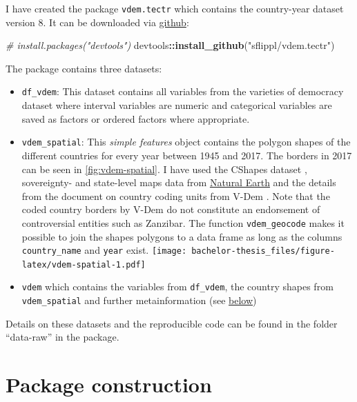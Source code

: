 \documentclass[]{report}
\newenvironment{Shaded}{\begin{snugshade}}{\end{snugshade}}
\newcommand{\KeywordTok}[1]{\textcolor[rgb]{0.13,0.29,0.53}{\textbf{#1}}}
\newcommand{\StringTok}[1]{\textcolor[rgb]{0.31,0.60,0.02}{#1}}
\newcommand{\CommentTok}[1]{\textcolor[rgb]{0.56,0.35,0.01}{\textit{#1}}}
\newcommand{\OperatorTok}[1]{\textcolor[rgb]{0.81,0.36,0.00}{\textbf{#1}}}
\newcommand{\NormalTok}[1]{#1}
\providecommand{\tightlist}{%
  \setlength{\itemsep}{0pt}\setlength{\parskip}{0pt}}
\theoremstyle{definition}
\theoremstyle{definition}
\theoremstyle{definition}
\theoremstyle{remark}
\begin{document}
I have created the package \texttt{vdem.tectr} which contains the
country-year dataset version 8. It can be downloaded via
\href{github.com/sflippl/vdem.tectr}{github}:

\begin{Shaded}
\begin{Highlighting}[]
\CommentTok{# install.packages("devtools")}
\NormalTok{devtools}\OperatorTok{::}\KeywordTok{install_github}\NormalTok{(}\StringTok{"sflippl/vdem.tectr"}\NormalTok{)}
\end{Highlighting}
\end{Shaded}

The package contains three datasets:

\begin{itemize}
\tightlist
\item
  \texttt{df\_vdem}: This dataset contains all variables from the
  varieties of democracy dataset where interval variables are numeric
  and categorical variables are saved as factors or ordered factors
  where appropriate.
\item
  \texttt{vdem\_spatial}: This \emph{simple features} object \citep{sf}
  contains the polygon shapes of the different countries for every year
  between 1945 and 2017. The borders in 2017 can be seen in
  \ref{fig:vdem-spatial}. I have used the CShapes dataset
  \citep[\citet{Weidmann2010a}]{Weidmann2010}, sovereignty- and
  state-level maps data from \href{www.naturalearthdata.com}{Natural
  Earth} and the details from the document on country coding units from
  V-Dem \citep{Coppedge2018}. Note that the coded country borders by
  V-Dem do not constitute an endorsement of controversial entities such
  as Zanzibar. The function \texttt{vdem\_geocode} makes it possible to
  join the shapes polygons to a data frame as long as the columns
  \texttt{country\_name} and \texttt{year} exist.
  \texttt{[image: bachelor-thesis\_files/figure-latex/vdem-spatial-1.pdf]}
\item
  \texttt{vdem} which contains the variables from \texttt{df\_vdem}, the
  country shapes from \texttt{vdem\_spatial} and further metainformation
  (see \protect\hyperlink{application}{below})
\end{itemize}

Details on these datasets and the reproducible code can be found in the
folder ``data-raw'' in the package.

\section{Package construction}\label{package-construction}
\end{document}
